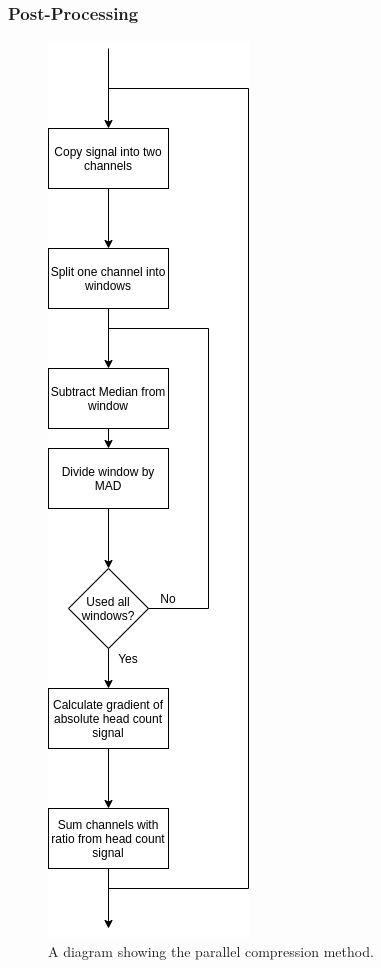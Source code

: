                 \subsubsection{Post-Processing} \label{sec:pca_data_driven_surrogate_signal_extraction_methods_for_dynamic_pet_methods_post_processing}
                    \begin{figure}
                        \centering
                        
                        \includegraphics[width=0.3\linewidth]{figures/data_driven_surrogate_signal_extraction_methods_1_parallel_compression.png}
                        
                        \captionsetup{singlelinecheck=false, justification=centering}
                        \caption{A diagram showing the parallel compression method.}
                        \label{fig:pca_data_driven_surrogate_signal_extraction_methods_for_dynamic_pet_methods_parallel_compression}
                    \end{figure}
                    

